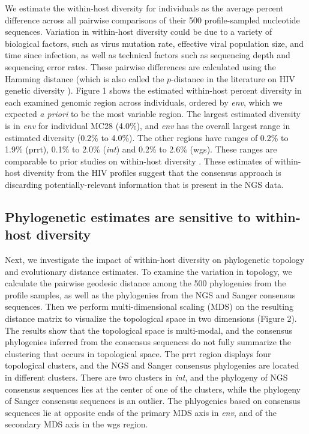 \documentclass[letterpaper]{article}
\begin{document}
We estimate the within-host diversity for individuals as the average percent difference across all pairwise comparisons of their 500 profile-sampled nucleotide sequences. Variation in within-host diversity could be due to a variety of biological factors, such as virus mutation rate, effective viral population size, and time since infection, as well as technical factors such as sequencing depth and sequencing error rates. These pairwise differences are calculated using the Hamming distance \parencite{allam} (which is also called the $p$-distance in the literature on HIV genetic diversity \parencite{maldarelli, hassan}). Figure 1 shows the estimated within-host percent diversity in each examined genomic region across individuals, ordered by \emph{env}, which we expected \emph{a priori} to be the most variable region. The largest estimated diversity is in \emph{env} for individual MC28 (4.0\%), and \emph{env} has the overall largest range in estimated diversity (0.2\% to 4.0\%). The other regions have ranges of 0.2\% to 1.9\% (prrt), 0.1\% to 2.0\% (\emph{int}) and 0.2\% to 2.6\% (wgs). These ranges are comparable to prior studies on within-host diversity \parencite{li, zanini}. These estimates of within-host diversity from the HIV profiles suggest that the consensus approach is discarding potentially-relevant information that is present in the NGS data.

\subsection*{Phylogenetic estimates are sensitive to within-host diversity}

Next, we investigate the impact of within-host diversity on phylogenetic topology and evolutionary distance estimates. To examine the variation in topology, we calculate the pairwise geodesic distance \parencite{billera,owen} among the 500 phylogenies from the profile samples, as well as the phylogenies from the NGS and Sanger consensus sequences. Then we perform multi-dimensional scaling (MDS) on the resulting distance matrix to visualize the topological space in two dimensions (Figure 2). The results show that the topological space is multi-modal, and the consensus phylogenies inferred from the consensus sequences do not fully summarize the clustering that occurs in topological space. The prrt region displays four topological clusters, and the NGS and Sanger consensus phylogenies are located in different clusters. There are two clusters in \emph{int}, and the phylogeny of NGS consensus sequences lies at the center of one of the clusters, while the phylogeny of Sanger consensus sequences is an outlier. The phlyogenies based on consensus sequences lie at opposite ends of the primary MDS axis in \emph{env}, and of the secondary MDS axis in the wgs region.
\end{document}
